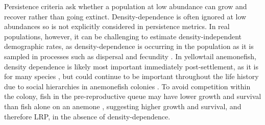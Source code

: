 \documentclass[12pt, oneside]{article}   	%
\begin{document}
Persistence criteria \citep{hastings_persistence_2006, burgess2014beyond} ask whether a population at low abundance can grow and recover rather than going extinct. Density-dependence is often ignored at low abundances \citep{botsford2019population} so is not explicitly considered in persistence metrics. In real populations, however, it can be challenging to estimate density-independent demographic rates, as density-dependence is occurring in the population as it is sampled in processes such as dispersal \citep[e.g. in butterflies,][]{nowicki2011evidence} and fecundity \citep[e.g. in warblers,][]{rodenhouse2003multiple}. In yellowtail anemonefish, density dependence is likely most important immediately post-settlement, as it is for many species \citep[e.g. corals, trees, and butterflies:][]{vermeij2008density, harms2000pervasive, nowicki2009relative}, but could continue to be important throughout the life history due to social hierarchies in anemonefish colonies \citep[e.g.][]{buston2011determinants}. To avoid competition within the colony, fish in the pre-reproductive queue may have lower growth and survival than fish alone on an anemone \citep[seen in \textit{A. percula},][]{buston2003forcible, buston2003social}, suggesting higher growth and survival, and therefore LRP, in the absence of density-dependence.
\end{document}
